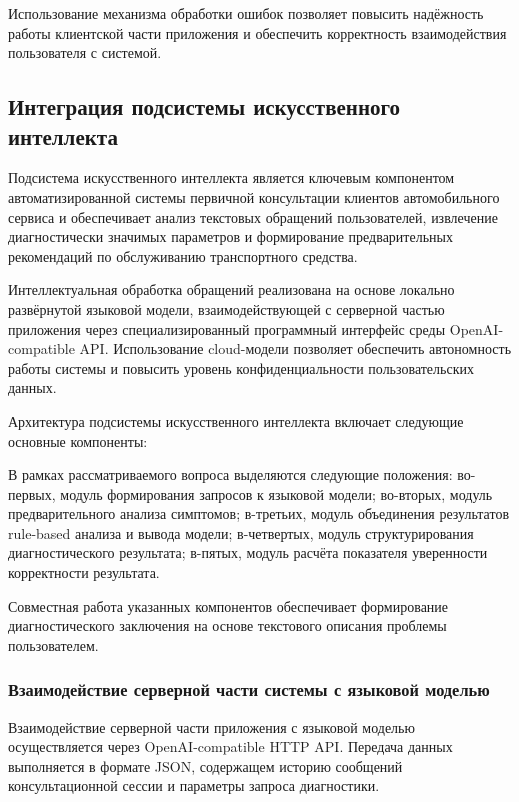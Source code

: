 \documentclass[14pt,a4paper]{extarticle}
\numberwithin{figure}{section}
\numberwithin{table}{section}
\begin{document}
Использование механизма обработки ошибок позволяет повысить надёжность
работы клиентской части приложения и обеспечить корректность
взаимодействия пользователя с системой.

\subsection{Интеграция подсистемы искусственного
интеллекта}\label{ux438ux43dux442ux435ux433ux440ux430ux446ux438ux44f-ux43fux43eux434ux441ux438ux441ux442ux435ux43cux44b-ux438ux441ux43aux443ux441ux441ux442ux432ux435ux43dux43dux43eux433ux43e-ux438ux43dux442ux435ux43bux43bux435ux43aux442ux430}

Подсистема искусственного интеллекта является ключевым компонентом
автоматизированной системы первичной консультации клиентов
автомобильного сервиса и обеспечивает анализ текстовых обращений
пользователей, извлечение диагностически значимых параметров и
формирование предварительных рекомендаций по обслуживанию транспортного
средства.

Интеллектуальная обработка обращений реализована на основе локально
развёрнутой языковой модели, взаимодействующей с серверной частью
приложения через специализированный программный интерфейс среды
OpenAI-compatible API. Использование cloud-модели позволяет обеспечить
автономность работы системы и повысить уровень конфиденциальности
пользовательских данных.

Архитектура подсистемы искусственного интеллекта включает следующие
основные компоненты:


В рамках рассматриваемого вопроса выделяются следующие положения: во-первых, модуль формирования запросов к языковой модели; во-вторых, модуль предварительного анализа симптомов; в-третьих, модуль объединения результатов rule-based анализа и вывода модели; в-четвертых, модуль структурирования диагностического результата; в-пятых, модуль расчёта показателя уверенности корректности результата.


Совместная работа указанных компонентов обеспечивает формирование
диагностического заключения на основе текстового описания проблемы
пользователем.

\subsubsection{Взаимодействие серверной части системы с языковой моделью}

Взаимодействие серверной части приложения с языковой моделью
осуществляется через OpenAI-compatible HTTP API. Передача данных
выполняется в формате JSON, содержащем историю сообщений
консультационной сессии и параметры запроса диагностики.
\end{document}
